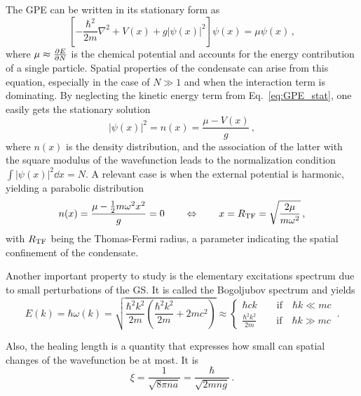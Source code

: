 The GPE can be written in its stationary form as
\begin{equation}
    \left[ 
        -\frac{\hbar^2}{2m}\nabla^2 + V(x) + g|\psi(x)|^2
    \right] \psi(x) = \mu \psi(x)\, ,
    \label{eq:GPE_stat}
\end{equation}
where $\mu \approx \pdv{E}{N}$ is the chemical potential and accounts for the energy contribution of a single particle. Spatial properties of the condensate can arise from this equation, especially in the case of $N \gg 1$ and when the interaction term is dominating. By neglecting the kinetic energy term from Eq.\ \eqref{eq:GPE_stat}, one easily gets the stationary solution
\[
    |\psi(x)|^2 = n(x) = \frac{\mu - V(x)}{g}\, ,
\]
where $n(x)$ is the density distribution, and the association of the latter with the square modulus of the wavefunction leads to the normalization condition $\int |\psi(x)|^2 \dd x = N$. A relevant case is when the external potential is harmonic, yielding a parabolic distribution
\begin{equation}
    n(x) = \frac{\mu - \frac{1}{2}m\omega^2x^2}{g} = 0 \qquad
    \Leftrightarrow \qquad
    x = R_{\rm TF} = \sqrt{\frac{2\mu}{m\omega^2}}\, ,
    \label{eq:TF}
\end{equation}
with $R_{\rm TF}$ being the Thomas-Fermi radius, a parameter indicating the spatial confinement of the condensate.

Another important property to study is the elementary excitations spectrum due to small perturbations of the GS. It is called the Bogoljubov spectrum and yields
\begin{equation*}
    E(k) = \hbar \omega(k) = \sqrt{\frac{\hbar^2 k^2}{2m}\left(\frac{\hbar^2 k^2}{2m} + 2mc^2\right)} \approx
    \begin{cases}
        \hbar c k \qquad \text{if} \quad \hbar k \ll mc\\
        \frac{\hbar^2 k^2}{2m} \qquad \text{if} \quad \hbar k \gg mc
    \end{cases}\, .
    \label{eq:excit}
\end{equation*}

Also, the healing length is a quantity that expresses how small can spatial changes of the wavefunction be at most. It is
\begin{equation*}
    \xi = \frac{1}{\sqrt{8\pi n a}} = \frac{\hbar}{\sqrt{2m n g}}\, .
\end{equation*}


